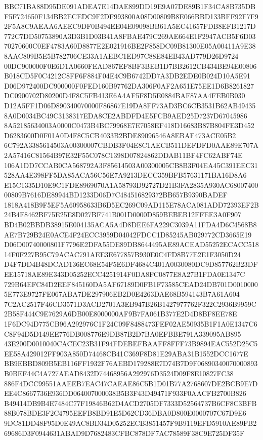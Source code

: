 \documentclass[UTF8,fontset=fandol,zihao=-4,a4paper]{ctexart}
\begin{document}
{{BBC71BA88D95DE091ADEA7E14DAE899DD19E9A07DE89B1F34CA8B735DBF5F724650F134BB2ECEDC9F2DF993800A08D00809B8E066BBD133BFF92F7F9
2F5A8C9AEAA6AEEC9DF0B494EE04E09098BB61A5EC41657FDB8EFB1217D772C7DD50753890A3D3B1D03B41A8FBAE479C269AE664E1F2947ACB5F6D03
70270600C0EF4783A60D8877E2E021916BE2F858DC09B81300E05A00411A9E388AAC809B5E5B782706CE33A1AEBC1ED97C88E84EB43AD779D26D9724
00DC900000F0E6D1A0660FEAD867EF8BF3BEB1D7BB2612CB434BE94E00806B018CD5F0C4212C8FF6F884F04E4C9B6742DD7A3DB2EDE0B024D10A5E91
D06D972400DC900000F0FED160B97762DA306F0AF2A651E75EE1D6B8261827DC0900702D80200D4F8C5FB413E6A4AF5F8D5E0884BAF87AA4FEB0B030
D12A5FF1D06D890340070000F86867E19DA8FF73AD3BC6CB3531B62AB494358A0D0034BC49C3138317EDA8CE2ABDFD4E5FCB9AED25D7237D67045986
8A52185634003A0000C0473B4BC79968E7E7058EF418D16683B87B804FE3D452D6283600D0F01A0D4F8C5CB4033B2BDE89096546A8EBAF473ACE05B2
6C792A3385614503A00300007CBDB3F04E8C1AECB511DEFDFD0AAE89E707A2A57416C81564B97E32F55C078C1398D07824862DDAB11BF4FC62ABF74E
106A1DD7CCAB0CA568792A3F85614503A00300005CB8B3F04EA45C391EEC31528AA4E398FF5DA85ACA56C56E7A9213DECC359BFB57631171BA16D8A6
E15C1335D10E9C1FDE8969070A1A58793D92727D21B3FA2835A930AC6800740000809B7616DE89944BD1233D06D7C484516829372BB657B9390BADEF
1818A418B9F5EF5A60958633B6D5EC269C09AD115E78ACA081ADD72393EF2B24B4F8462BF75E25E8D027BF741B001D0000D859BEBEB12FFEE3A0F907
BD4B02BBDB38915E004135ACA5A4D8DEE6FA229C3039A11FDA4D6C4568B8AE7B729B24E0ACE4F24ECC3959D04042FDCC1D85245AB029772CD3665E19
D06D00740000801F7796E2DFA55DE89DB8644495AE89ACEAD55252ECACC51814F0F227B95C79ACAC791AEE3E677857B930E0C4FD8B77E2E1F3050D24
D4F7DD4B48DCAD136EC68E54F5E6DF4684C401A0030080DC9D857762B23DFEE15718AE89E343D05252ECC4251914F0DA8FC0877E8A27B1FDA0E1347C
729B64EFC84D2EEF845160DA5AF67189D0FB1F73585CEAD24DB701D00100005E773E9727FE067ABA7DE297906EB2D0E4263DAE68B594143B7A61A604
7C2AC2517F46CD3571D3ACD2701A3EB947B26B1427977762F322C2936B9959C2B58F444C9E7629A6DB00E8000000AF9B7FA061B377E2D4D8BF8EE78E
1F6DC94D775CB96A292976C1F24C09F8488473FEF02AE50935B1F1A0E1347C6C8F94D5D149EE776DB008776E9DB87B2D7BA0EFBBE791A339095AB895
43E200D0010040CACEC23B31F94FDEBEFBAAFF8FFF73B9894EAC552D25C5EE58A429012FF903A850D74468CB41C369F8D81E29ABA31B1552DCC1677E
BB9EBBD809B5EB116FF1932F76AEBD179288E7D74B7D9F06890340070000893B0BEF44C4A727AEAD8432D74468956A292976D3524D09F8E10827FC38
886F4DCC99551AAEEB7EAC47CAEAE86C5B1D01B77A2768607DE2BCB9E7DEE4C8667736E936DD064007000038B5B3F43D49471F933F0AACFB2700B826
B49414DB9B4E7484C77F19846B62D4ACD2705DF7333D52564737B6CF8C3BFB88B078BDE3F2C4795EEFB8BD91E5D62CD36DBA0D800E0000707C67D9E6
9DC81DD48F95D0E49AC8BD34D05252ECB3851457F9B9119EFD5910AE89FB269686D3F0944631ABAD9D7682483CFBC878DF7AC78589F38C9E725DF35F
}}
\end{document}

